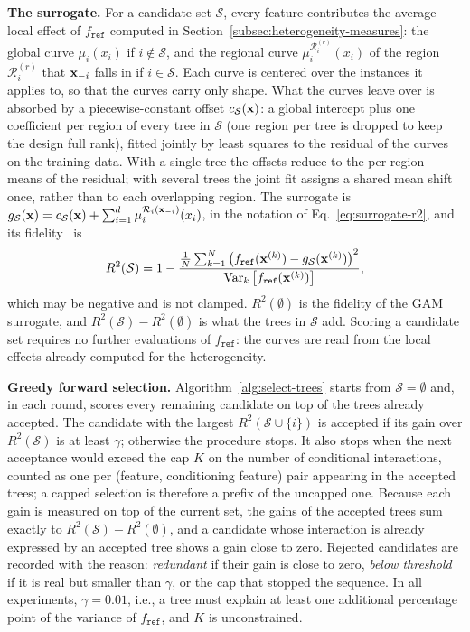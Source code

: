\textbf{The surrogate.}
For a candidate set $\mathcal{S}$, every feature contributes the average local effect of $f_{\texttt{ref}}$ computed in Section~\ref{subsec:heterogeneity-measures}: the global curve $\mu_i(x_i)$ if $i \notin \mathcal{S}$, and the regional curve $\mu_i^{\mathcal{R}_i^{(r)}}(x_i)$ of the region $\mathcal{R}_i^{(r)}$ that $\mathbf{x}_{-i}$ falls in if $i \in \mathcal{S}$.
Each curve is centered over the instances it applies to, so that the curves carry only shape.
What the curves leave over is absorbed by a piecewise-constant offset $c_{\mathcal{S}}(\mathbf{x})$: a global intercept plus one coefficient per region of every tree in $\mathcal{S}$ (one region per tree is dropped to keep the design full rank), fitted jointly by least squares to the residual of the curves on the training data.
With a single tree the offsets reduce to the per-region means of the residual; with several trees the joint fit assigns a shared mean shift once, rather than to each overlapping region.
The surrogate is $g_{\mathcal{S}}(\mathbf{x}) = c_{\mathcal{S}}(\mathbf{x}) + \sum_{i=1}^d \mu_i^{\mathcal{R}_i(\mathbf{x}_{-i})}(x_i)$, in the notation of Eq.~\eqref{eq:surrogate-r2}, and its fidelity~\cite{tan2023considerations, szepannek2023how} is
\begin{equation}
\label{eq:surrogate-r2-app}
R^2(\mathcal{S}) = 1 - \frac{\frac{1}{N}\sum_{k=1}^N \left(f_{\texttt{ref}}(\mathbf{x}^{(k)}) - g_{\mathcal{S}}(\mathbf{x}^{(k)})\right)^2}{\mathrm{Var}_k\left[f_{\texttt{ref}}(\mathbf{x}^{(k)})\right]},
\end{equation}
which may be negative and is not clamped.
$R^2(\emptyset)$ is the fidelity of the GAM surrogate, and $R^2(\mathcal{S}) - R^2(\emptyset)$ is what the trees in $\mathcal{S}$ add.
Scoring a candidate set requires no further evaluations of $f_{\texttt{ref}}$: the curves are read from the local effects already computed for the heterogeneity.

\textbf{Greedy forward selection.}
Algorithm~\ref{alg:select-trees} starts from $\mathcal{S} = \emptyset$ and, in each round, scores every remaining candidate on top of the trees already accepted.
The candidate with the largest $R^2(\mathcal{S} \cup \{i\})$ is accepted if its gain over $R^2(\mathcal{S})$ is at least $\gamma$; otherwise the procedure stops.
It also stops when the next acceptance would exceed the cap $K$ on the number of conditional interactions, counted as one per (feature, conditioning feature) pair appearing in the accepted trees; a capped selection is therefore a prefix of the uncapped one.
Because each gain is measured on top of the current set, the gains of the accepted trees sum exactly to $R^2(\mathcal{S}) - R^2(\emptyset)$, and a candidate whose interaction is already expressed by an accepted tree shows a gain close to zero.
Rejected candidates are recorded with the reason: \emph{redundant} if their gain is close to zero, \emph{below threshold} if it is real but smaller than $\gamma$, or the cap that stopped the sequence.
In all experiments, $\gamma = 0.01$, i.e., a tree must explain at least one additional percentage point of the variance of $f_{\texttt{ref}}$, and $K$ is unconstrained.

